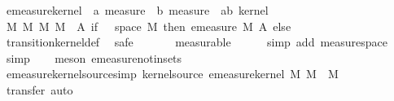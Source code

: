 \begin{isabellebody}
\ emeasure{\isacharunderscore}{\kern0pt}kernel\ {\isacharcolon}{\kern0pt}{\isacharcolon}{\kern0pt}\ {\isachardoublequoteopen}{\isacharprime}{\kern0pt}a\ measure\ {\isasymRightarrow}\ {\isacharprime}{\kern0pt}b\ measure\ {\isasymRightarrow}\ {\isacharparenleft}{\kern0pt}{\isacharprime}{\kern0pt}a{\isacharcomma}{\kern0pt}{\isacharprime}{\kern0pt}b{\isacharparenright}{\kern0pt}\ kernel{\isachardoublequoteclose}\ \isanewline
{\isachardoublequoteopen}{\isasymlambda}\ M\ M{\isacharprime}{\kern0pt}{\isachardot}{\kern0pt}\ {\isacharparenleft}{\kern0pt}M{\isacharcomma}{\kern0pt}\ M{\isacharprime}{\kern0pt}{\isacharcomma}{\kern0pt}\ {\isacharparenleft}{\kern0pt}{\isasymlambda}{\isasymomega}\ A{\isachardot}{\kern0pt}\ if\ {\isasymomega}\ {\isasymin}\ space\ M\ then\ emeasure\ M{\isacharprime}{\kern0pt}\ A\ else\ {}{\isacharparenright}{\kern0pt}{\isacharparenright}{\kern0pt}{\isachardoublequoteclose}\isanewline
%
\isadelimproof
\ \ %
\endisadelimproof
%
\isatagproof
{}\isamarkupfalse%
\ transition{\isacharunderscore}{\kern0pt}kernel{\isacharunderscore}{\kern0pt}def\ \isamarkupfalse%
\ safe\isanewline
\ \ \ \ \ \isamarkupfalse%
\ measurable\isanewline
\ \ \ \ \isamarkupfalse%
\ {\isacharparenleft}{\kern0pt}simp\ add{\isacharcolon}{\kern0pt}\ measure{\isacharunderscore}{\kern0pt}space{\isacharparenright}{\kern0pt}\isanewline
\ \ \isamarkupfalse%
\ simp\isanewline
\ \ \isamarkupfalse%
\ {\isacharparenleft}{\kern0pt}meson\ emeasure{\isacharunderscore}{\kern0pt}notin{\isacharunderscore}{\kern0pt}sets{\isacharparenright}{\kern0pt}\isanewline
\ \ \isamarkupfalse%
%
\endisatagproof
{\isafoldproof}%
%
\isadelimproof
\isanewline
%
\endisadelimproof
\isanewline
{}\isamarkupfalse%
\ emeasure{\isacharunderscore}{\kern0pt}kernel{\isacharunderscore}{\kern0pt}source{\isacharbrackleft}{\kern0pt}simp{\isacharbrackright}{\kern0pt}{\isacharcolon}{\kern0pt}\ {\isachardoublequoteopen}kernel{\isacharunderscore}{\kern0pt}source\ {\isacharparenleft}{\kern0pt}emeasure{\isacharunderscore}{\kern0pt}kernel\ M\ M{\isacharprime}{\kern0pt}{\isacharparenright}{\kern0pt}\ {\isacharequal}{\kern0pt}\ M{\isachardoublequoteclose}\isanewline
%
\isadelimproof
\ \ %
\endisadelimproof
%
\isatagproof
{}\isamarkupfalse%
\ {\isacharparenleft}{\kern0pt}transfer{\isacharcomma}{\kern0pt}\ auto{\isacharparenright}{\kern0pt}%
\endisatagproof
{\isafoldproof}%
%
\isadelimproof
\isanewline
%
\endisadelimproof
\isanewline
{}\isamarkupfalse%

\end{isabellebody}
